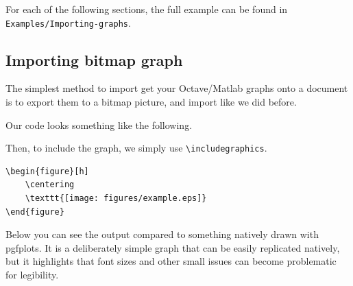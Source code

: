 For each of the following sections, the full example can be found in \verb|Examples/Importing-graphs|.
\subsection{Importing bitmap graph}
The simplest method to import get your Octave/Matlab graphs onto a document is to export them to a bitmap picture, and import like we did before.

Our code looks something like the following\footnotemark.


Then, to include the graph, we simply use \verb|\includegraphics|.
\begin{lstlisting}
\begin{figure}[h]
    \centering
    \texttt{[image: figures/example.eps]}
\end{figure}
\end{lstlisting}
Below you can see the output compared to something natively drawn with pgfplots.
It is a deliberately simple graph that can be easily replicated natively, but it highlights that font sizes and other small issues can become problematic for legibility.

